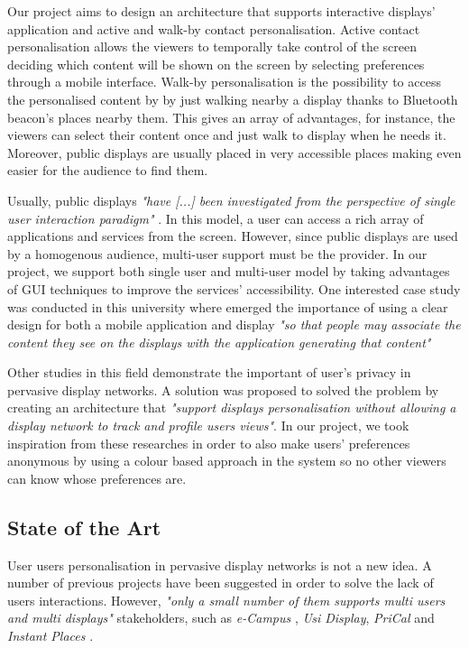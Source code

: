 \documentclass[]{usiinfbachelorproject}
\begin{document}
Our project aims to design an architecture that supports interactive displays' application and active and walk-by contact personalisation.
Active contact personalisation allows the viewers to temporally take control of the screen deciding which content will be shown on the screen by selecting preferences through a mobile interface. Walk-by personalisation is the possibility to access the personalised content by by just walking nearby a display thanks to Bluetooth beacon's places nearby them. This gives an array of advantages, for instance, the viewers can select their content once and just walk to display when he needs it. Moreover, public displays are usually placed in very accessible places making even easier for the audience to find them. 

Usually, public displays  \emph{"have [...] been investigated from the perspective of single user
interaction paradigm"} \cite{personalisation_and_privacy}. In this model, a user can access a rich array of applications and services from the screen. However, since public displays are used by a homogenous audience, multi-user support must be the provider. In our project, we support both single user and multi-user model by taking advantages of GUI techniques to improve the services' accessibility. One interested case study was conducted in this university \cite{design_considerations} where emerged the importance of using a clear design for both a mobile application and display  \emph{"so that people may associate the content they see on the displays with the application generating that content"} \cite{design_considerations}

Other studies in this field demonstrate the important of user's privacy in pervasive display networks. A solution was proposed \cite{personalisation_and_privacy} to solved the problem by creating an architecture that \emph{"support displays personalisation without allowing a display network to track and profile users views"}.
In our project, we took inspiration from these researches in order to also make users' preferences anonymous by using a colour based approach in the system so no other viewers can know whose preferences are. 
 
\subsection{State of the Art}
User users personalisation in pervasive display networks is not a new idea. A number of previous projects have been suggested in order to solve the lack of users interactions. However, \emph{"only a small number of them supports multi users and multi displays"} \cite{a_good_balance} stakeholders, such as \emph{e-Campus} \cite{e_campus}, \emph{Usi Display}, \emph{PriCal} \cite{pri_cal} and \emph{Instant Places} \cite{pins_and_posters}.
\end{document}
